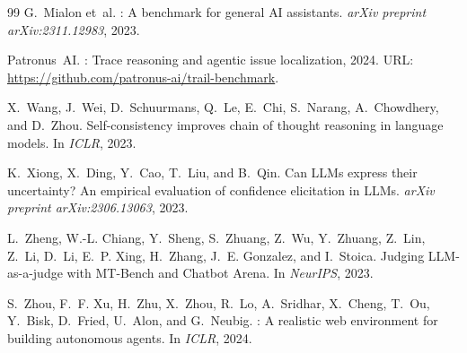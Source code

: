 \documentclass[11pt]{article}
\begin{document}
\begin{thebibliography}{99}
G.~Mialon et~al.
: A benchmark for general {AI} assistants.
\newblock \emph{arXiv preprint arXiv:2311.12983}, 2023.

Patronus~AI.
: Trace reasoning and agentic issue localization, 2024.
\newblock URL: \url{https://github.com/patronus-ai/trail-benchmark}.

X.~Wang, J.~Wei, D.~Schuurmans, Q.~Le, E.~Chi, S.~Narang, A.~Chowdhery, and D.~Zhou.
\newblock Self-consistency improves chain of thought reasoning in language models.
\newblock In \emph{ICLR}, 2023.

K.~Xiong, X.~Ding, Y.~Cao, T.~Liu, and B.~Qin.
\newblock Can {LLMs} express their uncertainty? An empirical evaluation of confidence elicitation in {LLMs}.
\newblock \emph{arXiv preprint arXiv:2306.13063}, 2023.

L.~Zheng, W.-L. Chiang, Y.~Sheng, S.~Zhuang, Z.~Wu, Y.~Zhuang, Z.~Lin, Z.~Li, D.~Li, E.~P. Xing, H.~Zhang, J.~E. Gonzalez, and I.~Stoica.
\newblock Judging {LLM}-as-a-judge with {MT-Bench} and {Chatbot Arena}.
\newblock In \emph{NeurIPS}, 2023.

S.~Zhou, F.~F. Xu, H.~Zhu, X.~Zhou, R.~Lo, A.~Sridhar, X.~Cheng, T.~Ou, Y.~Bisk, D.~Fried, U.~Alon, and G.~Neubig.
: A realistic web environment for building autonomous agents.
\newblock In \emph{ICLR}, 2024.

\end{thebibliography}
\end{document}
